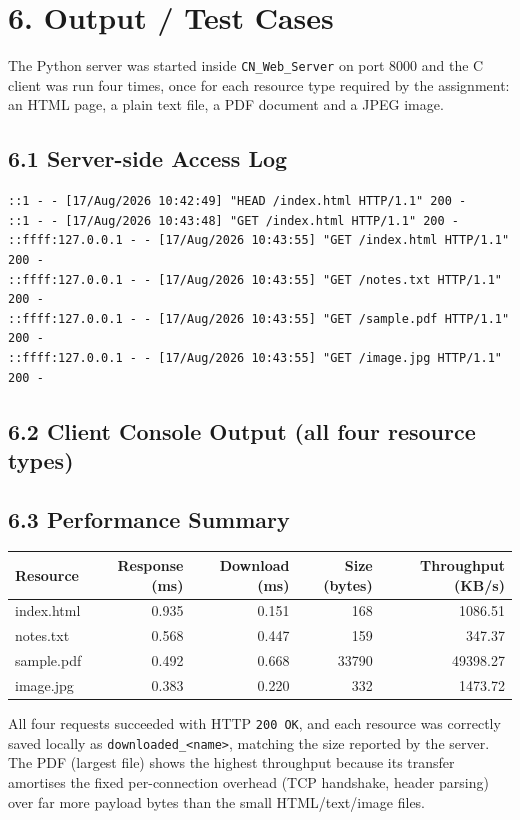 \documentclass[11pt]{article}
\begin{document}
\section*{6. Output / Test Cases}
The Python server was started inside \texttt{CN\_Web\_Server} on port 8000 and the C client was
run four times, once for each resource type required by the assignment: an HTML page, a plain
text file, a PDF document and a JPEG image.

\subsection*{6.1 Server-side Access Log}
\begin{lstlisting}[style=outstyle]
::1 - - [17/Aug/2026 10:42:49] "HEAD /index.html HTTP/1.1" 200 -
::1 - - [17/Aug/2026 10:43:48] "GET /index.html HTTP/1.1" 200 -
::ffff:127.0.0.1 - - [17/Aug/2026 10:43:55] "GET /index.html HTTP/1.1" 200 -
::ffff:127.0.0.1 - - [17/Aug/2026 10:43:55] "GET /notes.txt HTTP/1.1" 200 -
::ffff:127.0.0.1 - - [17/Aug/2026 10:43:55] "GET /sample.pdf HTTP/1.1" 200 -
::ffff:127.0.0.1 - - [17/Aug/2026 10:43:55] "GET /image.jpg HTTP/1.1" 200 -
\end{lstlisting}

\subsection*{6.2 Client Console Output (all four resource types)}


\subsection*{6.3 Performance Summary}
\begin{center}
\renewcommand{\arraystretch}{1.2}
\begin{tabular}{lrrrr}
\toprule
\textbf{Resource} & \textbf{Response (ms)} & \textbf{Download (ms)} & \textbf{Size (bytes)} & \textbf{Throughput (KB/s)} \\
\midrule
index.html & 0.935 & 0.151 & 168   & 1086.51 \\
notes.txt  & 0.568 & 0.447 & 159   & 347.37 \\
sample.pdf & 0.492 & 0.668 & 33790 & 49398.27 \\
image.jpg  & 0.383 & 0.220 & 332   & 1473.72 \\
\bottomrule
\end{tabular}
\end{center}
All four requests succeeded with HTTP \texttt{200 OK}, and each resource was correctly saved
locally as \texttt{downloaded\_<name>}, matching the size reported by the server. The PDF
(largest file) shows the highest throughput because its transfer amortises the fixed
per-connection overhead (TCP handshake, header parsing) over far more payload bytes than the
small HTML/text/image files.
\end{document}
